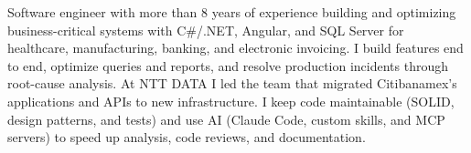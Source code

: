 Software engineer with more than 8 years of experience building and optimizing business-critical systems with C\#/.NET, Angular, and SQL Server for healthcare, manufacturing, banking, and electronic invoicing. I build features end to end, optimize queries and reports, and resolve production incidents through root-cause analysis. At NTT DATA I led the team that migrated Citibanamex's applications and APIs to new infrastructure. I keep code maintainable (SOLID, design patterns, and tests) and use AI (Claude Code, custom skills, and MCP servers) to speed up analysis, code reviews, and documentation.
